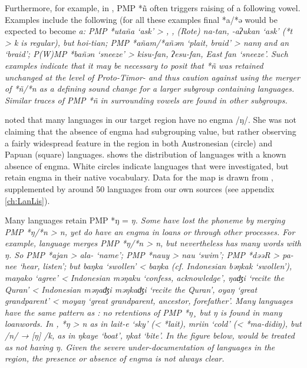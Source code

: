 Furthermore, for example, in ,
PMP *ñ often triggers raising of a following vowel.
Examples include the following (for all these examples final
*a/*ə would be expected to become \it{a}: PMP *utaña ‘ask’ >
, ,  (Rote) \it{na-tan},  \it{-aʔukan}
‘ask’ (*t > \it{k} is regular),
but  \it{hoi-tian}; PMP *añam/*añəm ‘plait,
braid’ >  \it{nanŋ}
and  \it{an} ‘braid’; P(W)MP *bañən ‘sneeze’ > 
\it{kisu-fan},  \it{ʔesu-fan}, East  \it{fan} ‘sneeze’.
Such examples indicate that it may be necessary to posit that
*ñ was retained unchanged at the level of Proto-Timor-
and thus caution against using the merger of *ñ/*n as a defining
sound change for a larger subgroup containing  languages.
Similar traces of PMP *ñ in surrounding vowels are found in other subgroups.

\citet{Schapper2015} noted that many languages in our target
region have no engma /ŋ/.
She was not claiming that the absence of engma had subgrouping
value, but rather observing a fairly widespread feature in the region
in both Austronesian (circle)
and Papuan (square) languages.
 shows the distribution of languages with a known absence of engma.
White circles indicate languages that were investigated,
but retain engma in their native vocabulary.
Data for the map is drawn from \citet{DonohueDawson2013},
supplemented by around 50 languages from our own sources (see appendix \ref{ch:LanLis}).

Many languages retain PMP *ŋ = \it{ŋ}.
Some have lost the phoneme by merging PMP *ŋ/*n > \it{n},
yet do have an engma in loans or through other processes.
For example,  language  merges PMP *ŋ/*n
> \it{n}, but nevertheless  has many words with \it{ŋ}.
So PMP *ajan > \it{ala-} ‘name’; PMP *nauy >
\it{nau} ‘swim’; PMP *dəəR > \it{pa-nee}
‘hear, listen’; but \it{baŋka} ‘swollen’ <   \it{baŋka} (cf.
Indonesian \it{bəŋkak} ‘swollen’), \it{maŋako} ‘agree’ < Indonesian
\it{məŋaku} ‘confess, acknowledge’, \it{ŋaʤi} ‘recite the Quran’ < Indonesian \it{məŋaʤi
{\tl} məŋkaʤi} ‘recite the Quran’,
\it{oyaŋ} ‘great grandparent’ <  \it{moyaŋ} ‘great grandparent, ancestor, forefather’.
Many  languages have the same pattern as :
no retentions of PMP *ŋ¸ but \it{ŋ} is found in many loanwords.
In , *ŋ > \it{n} as in \it{lait-e} ‘sky’ (< *lait),
\it{mriin} ‘cold’ (< *\it{ma-didiŋ}),
but /n/ → [ŋ] /{\gap}k,
as in \it{ŋkaye} ‘boat’, \it{ŋkat} ‘bite’.
In the figure below,
 would be treated as not having \it{ŋ}.
Given the severe under-documentation of languages in the region,
the presence or absence of engma is not always clear.


